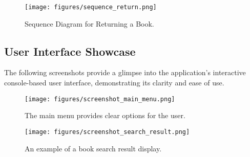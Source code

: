 \begin{figure}[H]
    \centering
    \texttt{[image: figures/sequence\_return.png]}
    \caption{Sequence Diagram for Returning a Book.}
    \label{fig:seq_return}
\end{figure}

\subsection{User Interface Showcase}
The following screenshots provide a glimpse into the application's interactive console-based user interface, demonstrating its clarity and ease of use.

\begin{figure}[H]
    \centering
    \texttt{[image: figures/screenshot\_main\_menu.png]}
    \caption{The main menu provides clear options for the user.}
    \label{fig:ss_main_menu}
\end{figure}

\begin{figure}[H]
    \centering
    \texttt{[image: figures/screenshot\_search\_result.png]}
    \caption{An example of a book search result display.}
    \label{fig:ss_search}
\end{figure}